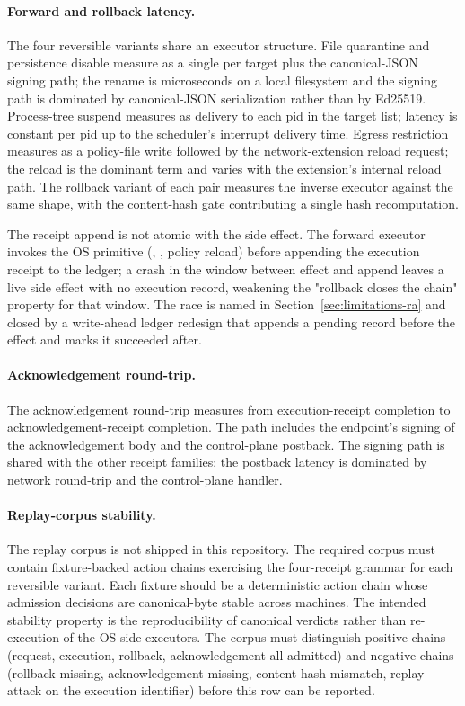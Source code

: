 \paragraph{Forward and rollback latency.}
The four reversible variants share an executor structure. File
quarantine and persistence disable measure as a single
 per target plus the canonical-JSON signing path;
the rename is microseconds on a local filesystem and the signing path
is dominated by canonical-JSON serialization rather than by Ed25519.
Process-tree suspend measures as  delivery to
each pid in the target list; latency is constant per pid up to the
scheduler's interrupt delivery time. Egress restriction measures as a
policy-file write followed by the network-extension reload request;
the reload is the dominant term and varies with the extension's
internal reload path. The rollback variant of each pair measures the
inverse executor against the same shape, with the content-hash gate
contributing a single hash recomputation.

The receipt append is not atomic with the side effect. The forward
executor invokes the OS primitive (,
, policy reload) before appending the execution
receipt to the ledger; a crash in the window between effect and
append leaves a live side effect with no execution record, weakening
the "rollback closes the chain" property for that window. The race
is named in Section~\ref{sec:limitations-ra} and closed by a
write-ahead ledger redesign that appends a pending record before the
effect and marks it succeeded after.

\paragraph{Acknowledgement round-trip.}
The acknowledgement round-trip measures from execution-receipt
completion to acknowledgement-receipt completion. The path includes
the endpoint's signing of the acknowledgement body and the
control-plane postback. The signing path is shared with the other
receipt families; the postback latency is dominated by network
round-trip and the control-plane handler.

\paragraph{Replay-corpus stability.}
The replay corpus is not shipped in this repository. The required corpus
must contain fixture-backed action chains exercising the four-receipt
grammar for each reversible variant. Each fixture should be a
deterministic action chain whose admission decisions are canonical-byte
stable across machines. The intended stability property is the
reproducibility of canonical verdicts rather than re-execution of the
OS-side executors. The corpus must distinguish positive chains (request,
execution, rollback, acknowledgement all admitted) and negative chains
(rollback missing, acknowledgement missing, content-hash mismatch, replay
attack on the execution identifier) before this row can be reported.

